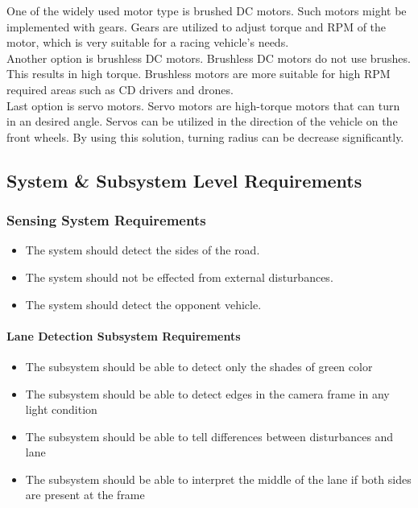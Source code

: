 \documentclass[a4paper,12pt]{article}
\begin{document}
			One of the widely used motor type is brushed DC motors. Such motors might be implemented with gears. Gears are utilized to adjust torque and RPM of the motor, which is very suitable for a racing vehicle's needs. \\

			Another option is brushless DC motors. Brushless DC motors do not use brushes. This results in high torque. Brushless motors are more suitable for high RPM required areas such as CD drivers and drones.\\

			Last option is servo motors. Servo motors are high-torque motors that can turn in an desired angle. Servos can be utilized in the direction of the vehicle on the front wheels. By using this solution, turning radius can be decrease significantly.\\

\subsection{System \& Subsystem Level Requirements}
		
	
	\subsubsection{Sensing System Requirements}
	
		\begin{itemize}
			\item The system should detect the sides of the road.
			\item The system should not be effected from external disturbances.
			\item The system should detect the opponent vehicle.
		\end{itemize}

	\paragraph{Lane Detection Subsystem Requirements}	
		
		\begin{itemize}
			\item The subsystem should be able to detect only the shades of green color
			\item The subsystem should be able to detect edges in the camera frame in any light condition
			\item The subsystem should be able to tell differences between disturbances and lane
			\item The subsystem should be able to interpret the middle of the lane if both sides are present at the frame
		\end{itemize}
	 
\end{document}
